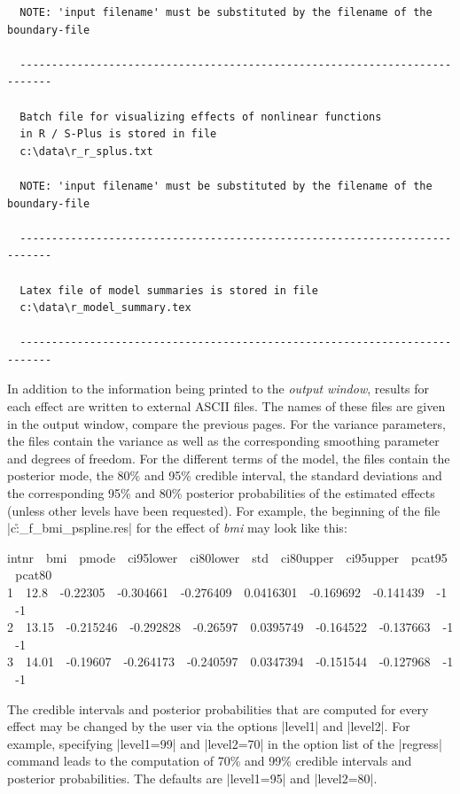 \begin{verbatim}
  NOTE: 'input filename' must be substituted by the filename of the boundary-file

  ---------------------------------------------------------------------------

  Batch file for visualizing effects of nonlinear functions
  in R / S-Plus is stored in file
  c:\data\r_r_splus.txt

  NOTE: 'input filename' must be substituted by the filename of the boundary-file

  ---------------------------------------------------------------------------

  Latex file of model summaries is stored in file
  c:\data\r_model_summary.tex

  ---------------------------------------------------------------------------
\end{verbatim}
\normalsize

In addition to the information being printed to the {\it output window}, results for each effect are written to external ASCII
files. The names of these files are given in the output window, compare the previous pages. For the variance parameters, the
files contain the variance as well as the corresponding smoothing parameter and degrees of freedom. For the different terms of
the model, the files contain the posterior mode, the 80\% and 95\% credible interval, the standard deviations and the
corresponding 95\% and 80\% posterior probabilities of the estimated effects (unless other levels have been requested). For
example, the beginning of the file |c:\data\r_f_bmi_pspline.res| for the effect of {\it bmi} may look like this:

{\footnotesize
 intnr \,\, bmi \,\, pmode \,\, ci95lower \,\, ci80lower \,\, std \,\, ci80upper \,\, ci95upper \,\, pcat95 \,\, pcat80\\
 1 \,\, 12.8 \,\, -0.22305 \,\, -0.304661 \,\, -0.276409 \,\, 0.0416301 \,\, -0.169692 \,\, -0.141439 \,\, -1 \,\, -1\\
 2 \,\, 13.15 \,\, -0.215246 \,\, -0.292828 \,\, -0.26597 \,\, 0.0395749 \,\, -0.164522 \,\, -0.137663 \,\, -1 \,\, -1\\
 3 \,\, 14.01 \,\, -0.19607 \,\, -0.264173 \,\, -0.240597 \,\, 0.0347394 \,\, -0.151544 \,\, -0.127968 \,\, -1 \,\, -1\\}

The credible intervals and posterior probabilities that are computed for every effect may be changed by the user via the
options |level1| and |level2|. For example, specifying |level1=99| and |level2=70| in the option list of the |regress| command
leads to the computation of 70\% and 99\% credible intervals and posterior probabilities. The defaults are |level1=95| and
|level2=80|.

